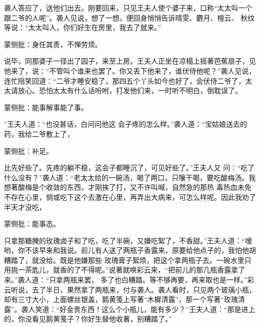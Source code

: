 \begin{parag}
    袭人答应了，送他们出去。刚要回来，只见王夫人使个婆子来，口称“太太叫一个跟二爷的人呢”。袭人见说，想了一想，便回身悄悄告诉晴雯、麝月、檀云、 秋纹等说：“太太叫人，你们好生在房里，我去了就来。”\begin{note}蒙侧批：身任其责，不惮劳烦。\end{note}说毕，同那婆子一径出了园子，来至上房。王夫人正坐在凉榻上摇著芭蕉扇子，见他来了，说：“不管叫个谁来也罢了。你又丢下他来了，谁伏侍他呢？”袭人见说，连忙陪笑回道：“二爷才睡安稳了，那四五个丫头如今也好了，会伏侍二爷了，太太请放心。恐怕太太有什么话吩咐，打发他们来，一时听不明白，倒耽误了。\begin{note}蒙侧批：能事解事能了事。\end{note}”王夫人道：“也没甚话，白问问他这 会子疼的怎么样。”袭人道：“宝姑娘送去的药，我给二爷敷上了，\begin{note}蒙侧批：补足。\end{note}比先好些了。先疼的躺不稳，这会子都睡沉了，可见好些了。”王夫人又 问：“吃了什么没有？”袭人道：“老太太给的一碗汤，喝了两口，只嚷干喝，要吃酸梅汤。我想著酸梅是个收敛的东西，才刚挨了打，又不许叫喊，自然急的那热 毒热血未免不存在心里，倘或吃下这个去激在心里，再弄出大病来，可怎么样呢。因此我劝了半天才没吃，\begin{note}蒙侧批：能事态。\end{note}只拿那糖腌的玫瑰卤子和了吃，吃了半碗，又嫌吃絮了，不香甜。”王夫人道：“嗳哟，你不该早来和我说。前儿有人送了两瓶子香露来，原要给他点子的，我怕他胡糟踏了，就没给。既是他嫌那些 玫瑰膏子絮烦，把这个拿两瓶子去。一碗水里只用挑一茶匙儿，就香的了不得呢。”说著就唤彩云来，“把前儿的那几瓶香露拿了来。”袭人道：“只拿两瓶来罢， 多了也白糟踏。等不够再要，再来取也是一样。”彩云听说，去了半日，果然拿了两瓶来，付与袭人。袭人看时，只见两个玻璃小瓶，却有三寸大小，上面螺丝银盖，鹅黄笺上写著“木樨清露”，那一个写著“玫瑰清露”。袭人笑道：“好金贵东西！这么个小瓶儿，能有多少？”王夫人道：“那是进上的，你没看见鹅黄笺子？你好生替他收著，别糟踏了。”
\end{parag}


